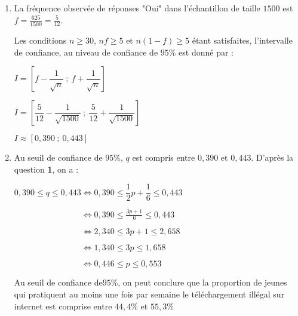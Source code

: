 \begin{corrige}
\begin{enumerate}
          \begin{enumerate}
               \item
               La fréquence observée de réponses "Oui" dans l'échantillon de taille $1500$ est $f = \frac{625}{1500} = \frac{5}{12}$.
               \par
               Les conditions $n \geqslant 30$, $nf \geqslant 5$ et $n(1-f) \geqslant 5$ étant satisfaites, l'intervalle de confiance, au niveau de confiance de $95$\% est donné par :
               \par
               $I=\left[f-\dfrac{1}{\sqrt{n}}~;~ f+\dfrac{1}{\sqrt{n}}\right]$
               \par
               $I=\left[\dfrac{5}{12}-\dfrac{1}{\sqrt{1500}}~;~ \dfrac{5}{12}+\dfrac{1}{\sqrt{1500}}\right]$
               \par
               $I \approx [0,390~;~0,443]$
               \item
               Au seuil de confiance de $95$\%, $q$ est compris entre $0,390$ et $0,443$. D'après la question \textbf{1}, on a :
               \par
               $0,390 \leqslant q \leqslant 0,443 \Leftrightarrow 0,390 \leqslant \dfrac{1}{2}p+\dfrac{1}{6} \leqslant 0,443$
               \par
               $\phantom{0,390 \leqslant q \leqslant 0,443 }\Leftrightarrow   0,390 \leqslant \frac{3p+1}{6} \leqslant 0,443 $
               \par
               $\phantom{0,390 \leqslant q \leqslant 0,443 }\Leftrightarrow 2,340 \leqslant 3p+1 \leqslant 2,658 $
               \par
               $\phantom{0,390 \leqslant q \leqslant 0,443 }\Leftrightarrow 1,340 \leqslant 3p \leqslant 1,658$
               \par
               $\phantom{0,390 \leqslant q \leqslant 0,443 }\Leftrightarrow  0,446 \leqslant p \leqslant 0,553 $
               \par
               Au seuil de confiance de$95$\%, on peut conclure que la proportion de jeunes qui pratiquent au moins une fois par semaine le téléchargement illégal sur internet est comprise entre $44,4$\% et $55,3$\%
          \end{enumerate}
     \end{enumerate}
\end{corrige}
